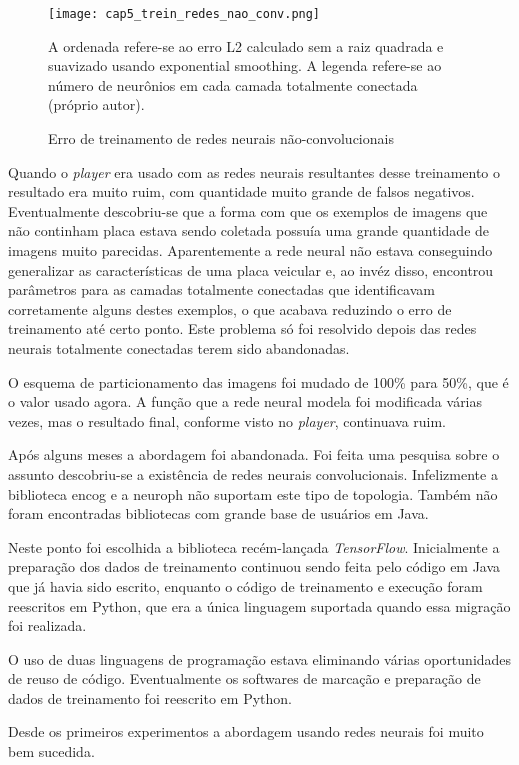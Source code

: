 \begin{figure}[!htb]
	\centering
	\texttt{[image: cap5\_trein\_redes\_nao\_conv.png]}
	\caption{Erro de treinamento de redes neurais não-convolucionais}
	\label{fig:cap5_trein_redes_nao_conv}
	A ordenada refere-se ao erro L2 calculado sem a raiz quadrada e suavizado
	usando exponential smoothing. A legenda refere-se ao número de neurônios
	em cada camada totalmente conectada (próprio autor).
\end{figure}

Quando o \emph{player} era usado com as redes neurais resultantes
desse treinamento o
resultado era muito ruim, com quantidade muito grande de falsos negativos.
Eventualmente descobriu-se que a forma com que os exemplos de imagens que não
continham placa estava sendo coletada possuía uma grande quantidade de imagens
muito parecidas. Aparentemente a rede neural não estava conseguindo generalizar
as características de uma placa veicular e, ao invéz disso, encontrou
parâmetros para as camadas totalmente conectadas que identificavam corretamente
alguns destes exemplos, o que acabava reduzindo o erro de treinamento até certo
ponto. Este problema só foi resolvido depois das redes neurais
totalmente conectadas terem sido abandonadas.

O esquema de particionamento das imagens foi mudado de 100\% para 50\%, que é o
valor usado agora. A função que a rede neural modela foi modificada
várias vezes, mas o resultado final, conforme visto no \emph{player},
continuava ruim.

Após alguns meses a abordagem foi abandonada. Foi feita uma pesquisa sobre o
assunto descobriu-se a existência de redes neurais convolucionais. Infelizmente
a biblioteca encog e a neuroph não suportam este tipo de topologia. Também não
foram encontradas bibliotecas com grande base de usuários em Java.

Neste ponto foi escolhida a biblioteca recém-lançada \emph{TensorFlow}.
Inicialmente a
preparação dos dados de treinamento continuou sendo feita pelo código em Java
que já havia sido escrito, enquanto o código de treinamento e execução foram
reescritos em Python, que era a única linguagem suportada quando essa
migração foi realizada.

O uso de duas linguagens de programação estava eliminando várias oportunidades
de reuso de código. Eventualmente os softwares de marcação e preparação de
dados de treinamento foi reescrito em Python.

Desde os primeiros experimentos a abordagem usando redes neurais foi muito bem
sucedida.

